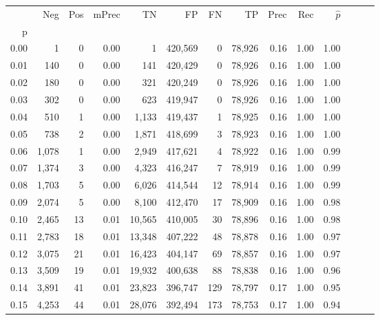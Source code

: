 \begin{tabular}{rrrrrrrrrrrrrr}
\toprule
{} &    Neg &    Pos & mPrec &       TN &       FP &      FN &      TP &  Prec &   Rec & $\hat{p}$ \\
p    &        &        &       &          &          &         &         &       &       &           \\
\midrule
0.00 &      1 &      0 &  0.00 &        1 &  420,569 &       0 &  78,926 &  0.16 &  1.00 &      1.00 \\
0.01 &    140 &      0 &  0.00 &      141 &  420,429 &       0 &  78,926 &  0.16 &  1.00 &      1.00 \\
0.02 &    180 &      0 &  0.00 &      321 &  420,249 &       0 &  78,926 &  0.16 &  1.00 &      1.00 \\
0.03 &    302 &      0 &  0.00 &      623 &  419,947 &       0 &  78,926 &  0.16 &  1.00 &      1.00 \\
0.04 &    510 &      1 &  0.00 &    1,133 &  419,437 &       1 &  78,925 &  0.16 &  1.00 &      1.00 \\
0.05 &    738 &      2 &  0.00 &    1,871 &  418,699 &       3 &  78,923 &  0.16 &  1.00 &      1.00 \\
0.06 &  1,078 &      1 &  0.00 &    2,949 &  417,621 &       4 &  78,922 &  0.16 &  1.00 &      0.99 \\
0.07 &  1,374 &      3 &  0.00 &    4,323 &  416,247 &       7 &  78,919 &  0.16 &  1.00 &      0.99 \\
0.08 &  1,703 &      5 &  0.00 &    6,026 &  414,544 &      12 &  78,914 &  0.16 &  1.00 &      0.99 \\
0.09 &  2,074 &      5 &  0.00 &    8,100 &  412,470 &      17 &  78,909 &  0.16 &  1.00 &      0.98 \\
0.10 &  2,465 &     13 &  0.01 &   10,565 &  410,005 &      30 &  78,896 &  0.16 &  1.00 &      0.98 \\
0.11 &  2,783 &     18 &  0.01 &   13,348 &  407,222 &      48 &  78,878 &  0.16 &  1.00 &      0.97 \\
0.12 &  3,075 &     21 &  0.01 &   16,423 &  404,147 &      69 &  78,857 &  0.16 &  1.00 &      0.97 \\
0.13 &  3,509 &     19 &  0.01 &   19,932 &  400,638 &      88 &  78,838 &  0.16 &  1.00 &      0.96 \\
0.14 &  3,891 &     41 &  0.01 &   23,823 &  396,747 &     129 &  78,797 &  0.17 &  1.00 &      0.95 \\
0.15 &  4,253 &     44 &  0.01 &   28,076 &  392,494 &     173 &  78,753 &  0.17 &  1.00 &      0.94 \\

\end{tabular}
